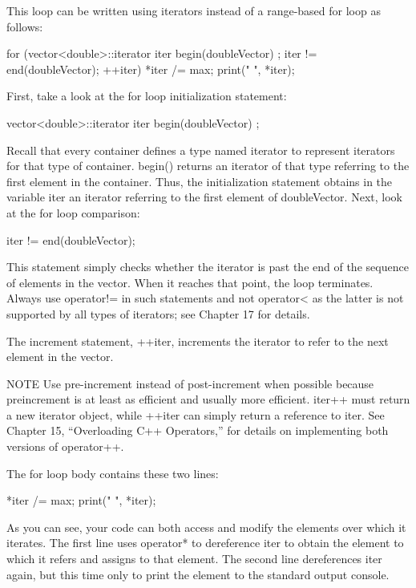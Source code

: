 This loop can be written using iterators instead of a range-based for loop as follows:

\begin{cpp}
for (vector<double>::iterator iter { begin(doubleVector) };
iter != end(doubleVector); ++iter) {
    *iter /= max;
    print("{} ", *iter);
}
\end{cpp}

First, take a look at the for loop initialization statement:

\begin{cpp}
vector<double>::iterator iter { begin(doubleVector) };
\end{cpp}

Recall that every container defines a type named iterator to represent iterators for that type of container. begin() returns an iterator of that type referring to the first element in the container. Thus, the initialization statement obtains in the variable iter an iterator referring to the first element of doubleVector. Next, look at the for loop comparison:

\begin{cpp}
iter != end(doubleVector);
\end{cpp}

This statement simply checks whether the iterator is past the end of the sequence of elements in the vector. When it reaches that point, the loop terminates. Always use operator!= in such statements and not operator< as the latter is not supported by all types of iterators; see Chapter 17 for details.

The increment statement, ++iter, increments the iterator to refer to the next element in the vector.

\begin{myNotic}{NOTE}
Use pre-increment instead of post-increment when possible because preincrement is at least as efficient and usually more efficient. iter++ must return a new iterator object, while ++iter can simply return a reference to iter. See Chapter 15, “Overloading C++ Operators,” for details on implementing both versions of operator++.
\end{myNotic}

The for loop body contains these two lines:

\begin{cpp}
*iter /= max;
print("{} ", *iter);
\end{cpp}

As you can see, your code can both access and modify the elements over which it iterates. The first line uses operator* to dereference iter to obtain the element to which it refers and assigns to that element. The second line dereferences iter again, but this time only to print the element to the standard output console.

